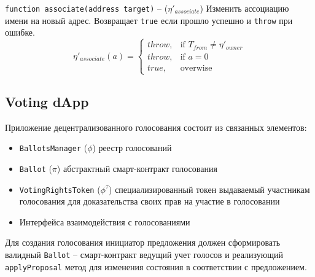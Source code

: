 \documentclass[12pt]{report}
\def\code#1{\colorbox{light-gray}{\texttt{#1}}}
\begin{document}
\code{function associate(address target)} – ($\eta'_{associate}$)\hfill\null\linebreak
Изменить ассоциацию имени на новый адрес. Возвращает \code{true} если прошло успешно и \code{throw} при ошибке.
\begin{equation}
\eta'_{associate}(a) = \begin{cases}
	throw, & \text{if } T_{from} \neq \eta'_{owner} \\
	throw, & \text{if } a = 0 \\
	true, & \text{overwise}
\end{cases}
\end{equation}

\subsection{Voting dApp}
\label{tech-apps-voting}
\begin{multicols}{2}
Приложение децентрализованного голосования состоит из связанных элементов:
\begin{itemize}
	\item \code{BallotsManager} ($\phi$)\hfill\null\linebreak
	реестр голосований
	\item \code{Ballot} ($\pi$)\hfill\null\linebreak
	абстрактный смарт-контракт голосования
	\item \code{VotingRightsToken} ($\phi^\tau$) \hfill\null\linebreak
	специализированный токен выдаваемый участникам голосования для доказательства своих прав на участие в голосовании
	\item Интерфейса взаимодействия с голосованиями
\end{itemize}
\vfill\null\columnbreak
Для создания голосования инициатор предложения должен сформировать валидный \code{Ballot} – смарт-контракт ведущий учет голосов и реализующий \code{applyProposal} метод для изменения состояния в соответствии с предложением. 
\end{multicols}
\end{document}

